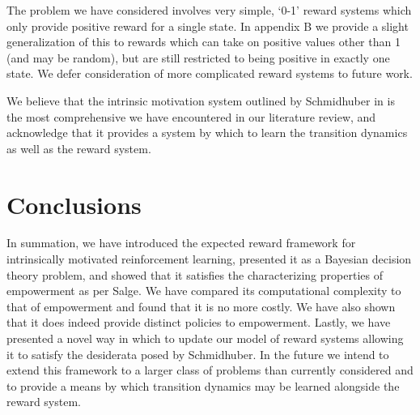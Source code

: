\documentclass{article}
\begin{document}
The problem we have considered involves very simple, `0-1' reward systems which only provide positive reward for a single state. In appendix B we provide a slight generalization of this to rewards which can take on positive values other than 1 (and may be random), but are still restricted to being positive in exactly one state. We defer consideration of more complicated reward systems to future work. 

We believe that the intrinsic motivation system outlined by Schmidhuber in \cite{schmidhuber2010formal} is the most comprehensive we have encountered in our literature review, and acknowledge that it provides a system by which to learn the transition dynamics as well as the reward system.

\section{Conclusions}
In summation, we have introduced the expected reward framework for intrinsically motivated reinforcement learning, presented it as a Bayesian decision theory problem, and showed that it satisfies the characterizing properties of empowerment as per Salge. We have compared its computational complexity to that of empowerment and found that it is no more costly. We have also shown that it does indeed provide distinct policies to empowerment. Lastly, we have presented a novel way in which to update our model of reward systems allowing it to satisfy the desiderata posed by Schmidhuber. In the future we intend to extend this framework to a larger class of problems than currently considered and to  provide a means by which transition dynamics may be learned alongside the reward system.
\newpage
\nocite{*}


\newpage
\end{document}
